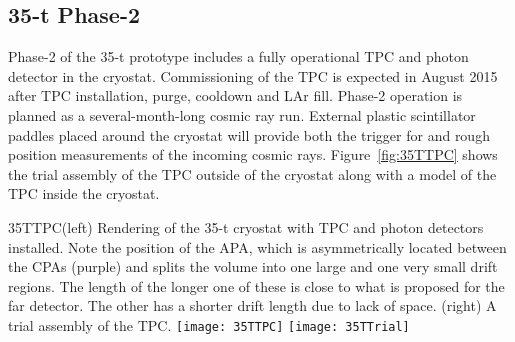 \subsection{35-t Phase-2}

Phase-2 of the 35-t prototype includes a fully operational TPC and
photon detector in the cryostat.  Commissioning of the TPC is expected
in August 2015 after TPC installation, purge, cooldown and LAr fill.
Phase-2 operation is planned as a several-month-long cosmic ray run.
External plastic scintillator paddles placed around the cryostat will
provide both the trigger for and rough position measurements of the
incoming cosmic rays.  Figure~\ref{fig:35TTPC} shows the trial
assembly of the TPC outside of the cryostat along with a model of the
TPC inside the cryostat.
\begin{cdrfigure}{35TTPC}{(left) Rendering of the
35-t cryostat with TPC and photon detectors installed. 
Note the position of the APA, which is asymmetrically located between the CPAs (purple) and
splits the volume into one large and one very small %
drift regions.
The length of the longer one of these is close to what is proposed for the far detector.
The other has a shorter drift length due to lack of space.
(right) A trial assembly of the TPC.
}
\texttt{[image: 35TTPC]}
\texttt{[image: 35TTrial]}
\end{cdrfigure}

